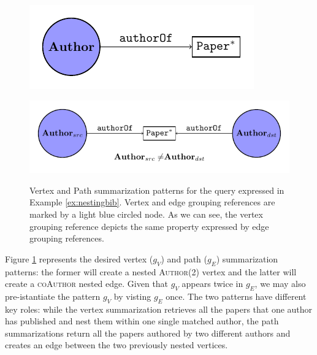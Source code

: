 \begin{example}
	
\begin{figure}[!t]
	\centering
	\begin{minipage}[!t]{0.5\textwidth}
		\centering
		\includegraphics[width=.6\textwidth]{images/nesting/patterns/00_vertex_pattern.pdf}
		\label{fig:vertexPat}
	\end{minipage} \begin{minipage}[!t]{0.4\textwidth}
		\centering
		\includegraphics[width=1\textwidth]{00_path_pattern.pdf}
		\label{fig:pathPat}
	\end{minipage}
	\caption{Vertex and Path summarization patterns for the query expressed in Example \ref{ex:nestingbib}. Vertex and edge grouping references are marked by a light blue circled node. As we can see, the vertex grouping reference depicts the same property expressed by edge grouping references.}
	\label{fig:patterns}
\end{figure}
	Figure \ref{fig:patterns} represents the desired vertex ($g_V$) and path ($g_E$) summarization patterns: the former will create a nested \textsc{Author}(2) vertex and the latter will create a \textsc{coAuthor} nested edge. Given that $g_V$ appears twice in $g_E$, we may also pre-istantiate the pattern $g_V$ by visting $g_E$ once. The two patterns have different key roles: while the vertex summarization retrieves all the papers that one author has published and nest them within one single matched author, the path summarizations return all the papers authored by two different authors and creates an edge between the two previously nested vertices. %
	

\end{example}
